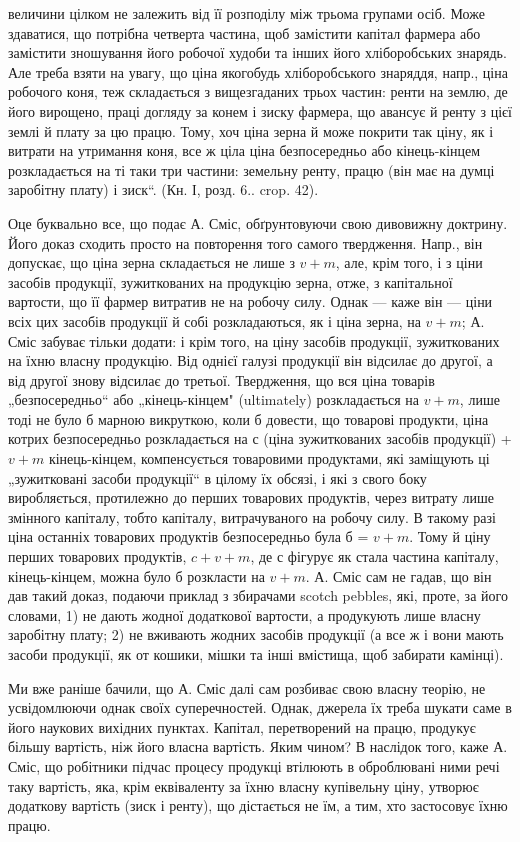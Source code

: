 \parcont{}  %
величини цілком не залежить від її розподілу між трьома групами осіб.
Може здаватися, що потрібна четверта частина, щоб замістити капітал
фармера або замістити зношування його робочої худоби та інших
його хліборобських знарядь. Але треба взяти на увагу, що ціна якогобудь
хліборобського знаряддя, напр., ціна робочого коня, теж складається
з вищезгаданих трьох частин: ренти на землю, де його вирощено,
праці догляду за конем і зиску фармера, що авансує й ренту з цієї
землі й плату за цю працю. Тому, хоч ціна зерна й може покрити так
ціну, як і витрати на утримання коня, все ж ціла ціна безпосередньо
або кінець-кінцем розкладається на ті таки три частини: земельну ренту,
працю (він має на думці заробітну плату) і зиск“. (Кн. І, розд. 6..
crop. 42).

Оце буквально все, що подає А. Сміс, обґрунтовуючи свою дивовижну
доктрину. Його доказ сходить просто на повторення того самого
твердження. Напр., він допускає, що ціна зерна складається не лише з
$v + m$, але, крім того, і з ціни засобів продукції, зужиткованих на продукцію
зерна, отже, з капітальної вартости, що її фармер витратив не
на робочу силу. Однак — каже він — ціни всіх цих засобів продукції й
собі розкладаються, як і ціна зерна, на $v + m$; А. Сміс забуває тільки
додати: і крім того, на ціну засобів продукції, зужиткованих на їхню
власну продукцію. Від однієї галузі продукції він відсилає до другої, а
від другої знову відсилає до третьої. Твердження, що вся ціна товарів
„безпосередньо“ або „кінець-кінцем" (ultimately) розкладається на $v + m$,
лише тоді не було б марною викруткою, коли б довести, що товарові
продукти, ціна котрих безпосередньо розкладається на с (ціна зужиткованих
засобів продукції) + $v + m$ кінець-кінцем, компенсується товаровими
продуктами, які заміщують ці „зужитковані засоби продукції“ в
цілому їх обсязі, і які з свого боку виробляється, протилежно до перших
товарових продуктів, через витрату лише змінного капіталу, тобто
капіталу, витрачуваного на робочу силу. В такому разі ціна останніх
товарових продуктів безпосередньо була б = $v + m$. Тому й ціну перших
товарових продуктів, $c + v + m$, де с фігурує як стала частина
капіталу, кінець-кінцем, можна було б розкласти на $v + m$. А. Сміс сам
не гадав, що він дав такий доказ, подаючи приклад з збирачами scotch
pebbles, які, проте, за його словами, 1) не дають жодної додаткової вартости,
а продукують лише власну заробітну плату; 2) не вживають жодних
засобів продукції (а все ж і вони мають засоби продукції, як от
кошики, мішки та інші вмістища, щоб забирати камінці).

Ми вже раніше бачили, що А. Сміс далі сам розбиває свою власну
теорію, не усвідомлюючи однак своїх суперечностей. Однак, джерела їх
треба шукати саме в його наукових вихідних пунктах. Капітал, перетворений
на працю, продукує більшу вартість, ніж його власна вартість.
Яким чином? В наслідок того, каже А. Сміс, що робітники підчас процесу
продукці втілюють в оброблювані ними речі таку вартість, яка,
крім еквіваленту за їхню власну купівельну ціну, утворює додаткову вартість
(зиск і ренту), що дістається не їм, а тим, хто застосовує їхню працю.
\parbreak{}  %
